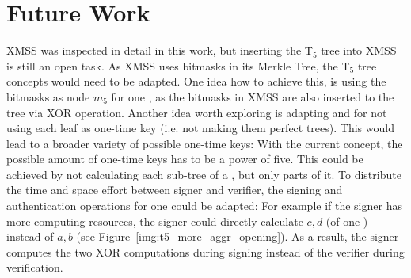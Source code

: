 \section{Future Work}
XMSS was inspected in detail in this work, but inserting the T$_5$ tree into XMSS is still an open task. As XMSS uses bitmasks in its Merkle Tree, the T$_5$ tree concepts would need to be adapted. One idea how to achieve this, is using the bitmasks as node $m_5$ for one \tftree, as the bitmasks in XMSS are also inserted to the tree via XOR operation.
Another idea worth exploring is adapting \tftree and \extree for not using each leaf as one-time key (i.e. not making them perfect trees). This would lead to a broader variety of possible one-time keys: With the current concept, the possible amount of one-time keys has to be a power of five. This could be achieved by not calculating each sub-tree of a \tftree, but only parts of it.
To distribute the time and space effort between signer and verifier, the signing and authentication operations for one \tfblock could be adapted: 
For example if the signer has more computing resources, the signer could directly calculate $c,d$ (of one \tfblock) instead of $a,b$ (see Figure~\ref{img:t5_more_aggr_opening}). As a result, the signer computes the two XOR computations during signing instead of the verifier during verification.
